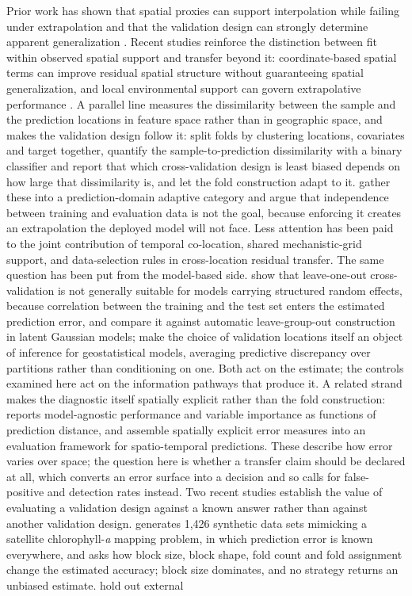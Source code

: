 Prior work has shown that spatial proxies can support interpolation while failing under extrapolation and that the validation design can strongly determine apparent generalization \citep{mila2024proxies,wadoux2021}. Recent studies reinforce the distinction between fit within observed spatial support and transfer beyond it: coordinate-based spatial terms can improve residual spatial structure without guaranteeing spatial generalization, and local environmental support can govern extrapolative performance \citep{pompili2026,portes2026}. A parallel line measures the dissimilarity between the sample and the prediction locations in feature space rather than in geographic space, and makes the validation design follow it: \citet{wang2023spatialplus} split folds by clustering locations, covariates and target together, \citet{wang2025adversarial} quantify the sample-to-prediction dissimilarity with a binary classifier and report that which cross-validation design is least biased depends on how large that dissimilarity is, and \citet{wang2025dissimilarity} let the fold construction adapt to it. \citet{linnenbrink2026beyond} gather these into a prediction-domain adaptive category and argue that independence between training and evaluation data is not the goal, because enforcing it creates an extrapolation the deployed model will not face. Less attention has been paid to the joint contribution of temporal co-location, shared mechanistic-grid support, and data-selection rules in cross-location residual transfer. The same question has been put from the model-based side. \citet{adin2024lgocv} show that leave-one-out cross-validation is not generally suitable for models carrying structured random effects, because correlation between the training and the test set enters the estimated prediction error, and compare it against automatic leave-group-out construction in latent Gaussian models; \citet{lobo2020bayescv} make the choice of validation locations itself an object of inference for geostatistical models, averaging predictive discrepancy over partitions rather than conditioning on one. Both act on the estimate; the controls examined here act on the information pathways that produce it. A related strand makes the diagnostic itself spatially explicit rather than the fold construction: \citet{brenning2023diagnostics} reports model-agnostic performance and variable importance as functions of prediction distance, and \citet{wiedemann2025geot} assemble spatially explicit error measures into an evaluation framework for spatio-temporal predictions. These describe how error varies over space; the question here is whether a transfer claim should be declared at all, which converts an error surface into a decision and so calls for false-positive and detection rates instead. Two recent studies establish the value of evaluating a validation design against a known answer rather than against another validation design. \citet{stock2025blocks} generates 1{,}426 synthetic data sets mimicking a satellite chlorophyll-\emph{a} mapping problem, in which prediction error is known everywhere, and asks how block size, block shape, fold count and fold assignment change the estimated accuracy; block size dominates, and no strategy returns an unbiased estimate. \citet{koldasbayeva2025stcv} hold out external 